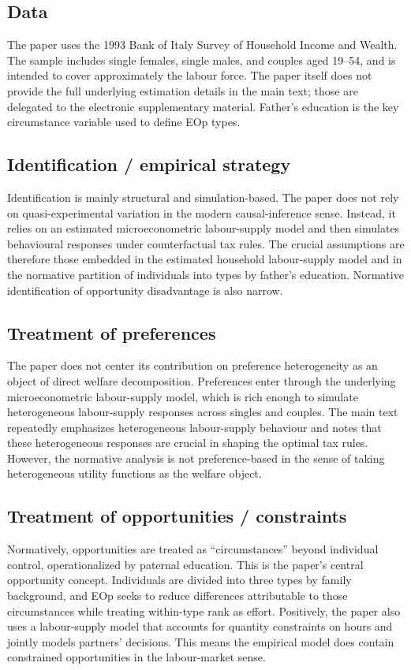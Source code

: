 \documentclass[11pt,a4paper]{article}
\begin{document}
\subsection*{Data}
The paper uses the 1993 Bank of Italy Survey of Household Income and Wealth. The sample includes single females, single males, and couples aged 19–54, and is intended to cover approximately the labour force. The paper itself does not provide the full underlying estimation details in the main text; those are delegated to the electronic supplementary material. Father’s education is the key circumstance variable used to define EOp types.

\subsection*{Identification / empirical strategy}
Identification is mainly structural and simulation-based. The paper does not rely on quasi-experimental variation in the modern causal-inference sense. Instead, it relies on an estimated microeconometric labour-supply model and then simulates behavioural responses under counterfactual tax rules. The crucial assumptions are therefore those embedded in the estimated household labour-supply model and in the normative partition of individuals into types by father’s education. Normative identification of opportunity disadvantage is also narrow.

\subsection*{Treatment of preferences}
The paper does not center its contribution on preference heterogeneity as an object of direct welfare decomposition. Preferences enter through the underlying microeconometric labour-supply model, which is rich enough to simulate heterogeneous labour-supply responses across singles and couples. The main text repeatedly emphasizes heterogeneous labour-supply behaviour and notes that these heterogeneous responses are crucial in shaping the optimal tax rules. However, the normative analysis is not preference-based in the sense of taking heterogeneous utility functions as the welfare object.

\subsection*{Treatment of opportunities / constraints}
Normatively, opportunities are treated as “circumstances” beyond individual control, operationalized by paternal education. This is the paper’s central opportunity concept. Individuals are divided into three types by family background, and EOp seeks to reduce differences attributable to those circumstances while treating within-type rank as effort. Positively, the paper also uses a labour-supply model that accounts for quantity constraints on hours and jointly models partners’ decisions. This means the empirical model does contain constrained opportunities in the labour-market sense.
\end{document}
